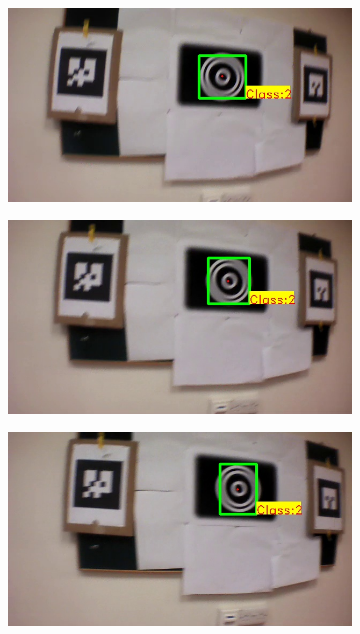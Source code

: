 \begin{figure}[ht!]
\begin{subfigure}[b]{.19\textwidth}
\end{subfigure}
\begin{subfigure}[b]{.19\textwidth}
\includegraphics[width=\linewidth]{figures/fiducial/BLUT_input_10/output2.jpg}
\end{subfigure}
\begin{subfigure}[b]{.19\textwidth}
\includegraphics[width=\linewidth]{figures/fiducial/BLUT_input_10/output3.jpg}
\end{subfigure}
\begin{subfigure}[b]{.19\textwidth}
\includegraphics[width=\linewidth]{figures/fiducial/BLUT_input_10/output4.jpg}

\end{subfigure}
\end{figure}
